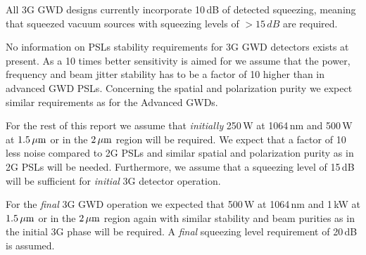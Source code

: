 All 3G GWD designs currently incorporate 10\,dB of detected squeezing, meaning that squeezed vacuum sources with squeezing levels of $> 15\,dB$ are required. 

No information on PSLs stability requirements for 3G GWD detectors exists at present. As a 10 times better sensitivity is aimed for we assume that the power, frequency and beam jitter stability has to be a factor of 10 higher than in advanced GWD PSLs. Concerning the spatial and polarization purity we expect similar requirements as for the Advanced GWDs.

For the rest of this report we assume that \emph{initially} 250\,W at 1064\,nm and 500\,W at  $ 1.5\, {\rm \mu m}$ or in the $ 2\, {\rm \mu m}$ region will be required. We expect that a factor of 10 less noise compared to 2G PSLs and similar spatial and polarization purity as in 2G PSLs will be needed. Furthermore, we assume that a squeezing level of 15\,dB will be sufficient for \emph{initial} 3G detector operation.

For the \emph{final} 3G GWD operation we expected that  500\,W at 1064\,nm and 1\,kW at  $ 1.5\, {\rm \mu m}$ or in the $ 2\, {\rm \mu m}$ region again with similar stability and beam purities as in the initial 3G phase will be required. A \emph{final} squeezing level requirement of 20\,dB is assumed.

%


